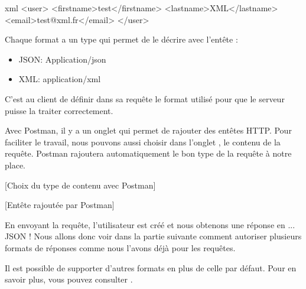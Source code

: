 \documentclass[big]{zmdocument}
\begin{document}
\begin{CodeBlock}{xml}
<user>
    <firstname>test</firstname>
    <lastname>XML</lastname>
    <email>test@xml.fr</email>
</user>
\end{CodeBlock}



Chaque format a un type  qui permet de le décrire avec l'entête  :



\begin{itemize}
\item JSON: Application/json
\item XML: application/xml
\end{itemize}


\begin{Information}
C'est au client de définir dans sa requête le format utilisé pour que le serveur puisse la traiter correctement.
\end{Information}


Avec Postman, il y a un onglet  qui permet de rajouter des entêtes HTTP. Pour faciliter le travail, nous pouvons aussi choisir dans l'onglet , le contenu de la requête. Postman rajoutera automatiquement le bon type  de la requête à notre place.



[Choix du type de contenu avec Postman]


[Entête rajoutée par Postman]


En envoyant la requête, l'utilisateur est créé et nous obtenons une réponse en ... JSON ! Nous allons donc voir dans la partie suivante comment autoriser plusieurs formats de réponses comme nous l'avons déjà pour les requêtes.



\begin{Information}
Il est possible de supporter d'autres formats en plus de celle par défaut. Pour en savoir plus, vous pouvez consulter .
\end{Information}


\end{document}
